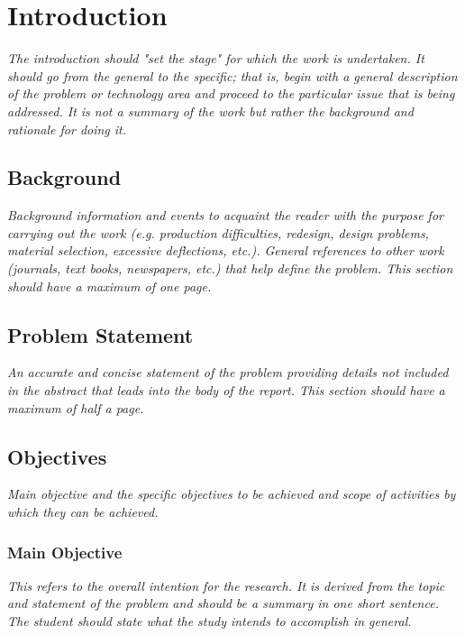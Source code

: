 \chapter{Introduction}
\label{cha:Introduction}      %

\emph{The introduction should "set the stage" for which the work is undertaken.
	It should go from the general to the specific; that is, begin with a general description of the problem or technology area and proceed to the particular issue that is being addressed.
	It is not a summary of the work but rather the background and rationale for doing it.}

\section{Background}
\emph{Background information and events to acquaint the reader with the purpose for carrying out the work (e.g. production difficulties, redesign, design problems, material selection, excessive deflections, etc.).
General references to other work (journals, text books, newspapers, etc.) that help define the problem.
This section should have a maximum of one page.}

\section{Problem Statement}
\emph{An accurate and concise statement of the problem providing details not included in the abstract that leads into the body of the report.
This section should have a maximum of half a page.}

\section{Objectives}
\emph{Main objective and the specific objectives to be achieved and scope of activities by which they can be achieved.}

\subsection{Main Objective}
\emph{This refers to the overall intention for the research.
	It is derived from the topic and statement of the problem and should be a summary in one short sentence.
	The student should state what the study intends to accomplish in general.}

